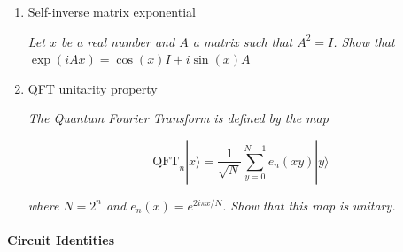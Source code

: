 \documentclass[letterpaper]{article} %
\begin{document}
\begin{enumerate}

\item Self-inverse matrix exponential

      \textit{Let $x$ be a real number and $A$ a matrix such that $A^2=I$.
              Show that} $\exp(iAx)=\cos (x) I + i \sin (x) A$

\item QFT unitarity property
      
      \textit{The Quantum Fourier Transform is defined by the map}
              
              \begin{equation*}
                \text{QFT}_n |x\rangle = \frac{1}{\sqrt{N}}
                \sum_{y=0}^{N-1} e_n (xy) |y\rangle
              \end{equation*}
      
      \textit{where $N=2^n$ and $e_n(x)=e^{2i\pi x/N}$. Show that this map is unitary.}

\end{enumerate}

\paragraph{Circuit Identities}
\end{document}
